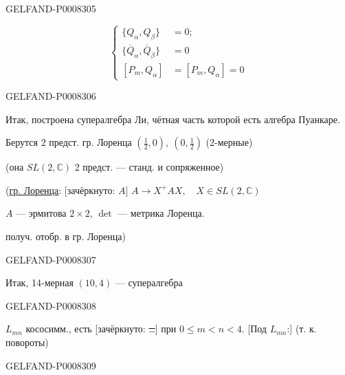 \begin{GelfandAdjacentEvidence}{GELFAND-P000830}{5}


\begin{equation*}
\left\{\begin{aligned}
\{Q_\alpha,Q_\beta\}&=0;\\
\{\overline{Q}_\alpha,\overline{Q}_\beta\}&=0\\
[P_m,Q_\alpha]&=[P_m,Q_{\dot\alpha}]=0
\end{aligned}\right.\tag{1}
\end{equation*}
\end{GelfandAdjacentEvidence}
\begin{GelfandAdjacentEvidence}{GELFAND-P000830}{6}


Итак, построена супералгебра Ли, чётная часть которой есть алгебра Пуанкаре.

Берутся 2 предст. гр. Лоренца \(\left(\frac12,0\right),\ \left(0,\frac12\right)\) (2-мерные)

(она \(SL(2,\mathbb{C})\) 2 предст. — станд. и сопряженное)

(\uline{гр. Лоренца}: [зачёркнуто: \sout{\(A\)}]
\(A\to X^+AX,\quad X\in SL(2,\mathbb{C})\)

\(A\) — эрмитова \(2\times2\), \(\det\) — метрика Лоренца.

получ. отобр. в гр. Лоренца)
\end{GelfandAdjacentEvidence}
\begin{GelfandAdjacentEvidence}{GELFAND-P000830}{7}


Итак, 14-мерная \((10,4)\) — супералгебра
\end{GelfandAdjacentEvidence}
\begin{GelfandAdjacentEvidence}{GELFAND-P000830}{8}


\(L_{mn}\) кососимм., есть [зачёркнуто: \sout{…}]
при \(0\le m<n<4\).
[Под \(L_{mn}\):] (т. к. повороты)
\end{GelfandAdjacentEvidence}
\begin{GelfandAdjacentEvidence}{GELFAND-P000830}{9}


\end{GelfandAdjacentEvidence}


